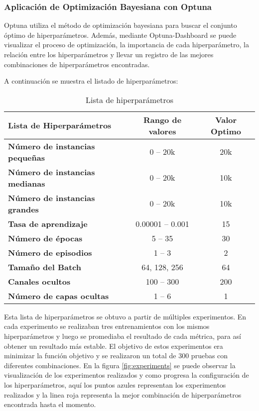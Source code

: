 \subsubsection{Aplicación de Optimización Bayesiana con Optuna}
Optuna utiliza el método de optimización bayesiana para buscar el conjunto óptimo de
hiperparámetros. Además, mediante Optuna-Dashboard se puede visualizar el proceso de
optimización, la importancia de cada hiperparámetro, la relación entre los hiperparámetros
y llevar un registro de las mejores combinaciones de hiperparámetros encontradas.\medskip

A continuación se muestra el listado de hiperparámetros:

\begin{table}[ht]
    \centering
    \begin{tabular}[ht]{l|c|c} 
        \textbf{Lista de Hiperparámetros} & \textbf{Rango de valores} & \textbf{Valor Optimo}\\
        \hline
        \textbf{Número de instancias pequeñas} & 0 -- 20k & 20k\\
        \textbf{Número de instancias medianas} & 0 -- 20k & 10k\\
        \textbf{Número de instancias grandes}  & 0 -- 20k & 10k \\
        \textbf{Tasa de aprendizaje} & 0.00001 -- 0.001 & 15 \\
        \textbf{Número de épocas} & 5 -- 35 & 30 \\ 
        \textbf{Número de episodios} & 1 -- 3 & 2 \\
        \textbf{Tamaño del Batch} & 64, 128, 256 & 64\\
        \textbf{Canales ocultos} & 100 -- 300 & 200 \\
        \textbf{Número de capas ocultas} & 1 -- 6 & 1 \\
    \end{tabular}
    \caption{Lista de hiperparámetros}
    \label{tab:hyperparams}
\end{table}

Esta lista de hiperparámetros se obtuvo a partir de múltiples experimentos. En cada 
experimento se realizaban tres entrenamientos con los mismos hiperparámetros y luego
se promediaba el resultado de cada métrica, para así obtener un resultado más estable.
El objetivo de estos experimentos era minimizar la función objetivo y se realizaron
un total de 300 pruebas con diferentes combinaciones. En la figura \ref{fig:experiments}
se puede observar la visualización de los experimentos realizados y como progresa la
configuración de los hiperparámetros, aquí los puntos azules representan los experimentos
realizados y la linea roja representa la mejor combinación de hiperparámetros encontrada
hasta el momento.

